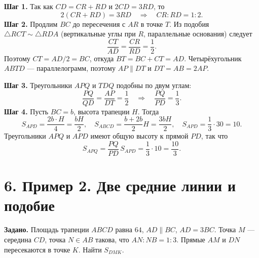 \documentclass[a4paper,12pt]{article}
\begin{document}
\textbf{Шаг 1.} Так как $CD=CR+RD$ и $2CD=3RD$, то
\[
2(CR+RD)=3RD\quad\Longrightarrow\quad CR:RD=1:2.
\]
\textbf{Шаг 2.} Продлим $BC$ до пересечения с $AR$ в точке $T$. Из подобия $\triangle RCT\sim\triangle RDA$ (вертикальные углы при $R$, параллельные основания) следует
\[
\frac{CT}{AD}=\frac{CR}{RD}=\frac12.
\]
Поэтому $CT=AD/2=BC$, откуда $BT=BC+CT=AD$. Четырёхугольник $ABTD$ --- параллелограмм, поэтому $AP\parallel DT$ и $DT=AB=2AP$.

\textbf{Шаг 3.} Треугольники $APQ$ и $TDQ$ подобны по двум углам:
\[
\frac{PQ}{QD}=\frac{AP}{DT}=\frac12
\quad\Longrightarrow\quad
\boxed{\frac{PQ}{PD}=\frac13}.
\]
\textbf{Шаг 4.} Пусть $BC=b$, высота трапеции $H$. Тогда
\[
S_{APD}=\frac{2b\cdot H}{4}=\frac{bH}{2},\quad
S_{ABCD}=\frac{b+2b}{2}H=\frac{3bH}{2},\quad
S_{APD}=\frac13\cdot30=10.
\]
Треугольники $APQ$ и $APD$ имеют общую высоту к прямой $PD$, так что
\[
\boxed{S_{APQ}=\frac{PQ}{PD}\,S_{APD}=\frac13\cdot10=\frac{10}{3}}.
\]
\clearpage

\section*{6. Пример 2. Две средние линии и подобие}
\textbf{Задано.} Площадь трапеции $ABCD$ равна $64$, $AD\parallel BC$, $AD=3BC$. Точка $M$ --- середина $CD$, точка $N\in AB$ такова, что $AN:NB=1:3$. Прямые $AM$ и $DN$ пересекаются в точке $K$. Найти $S_{DMK}$.

\begin{center}
\end{center}
\end{document}
